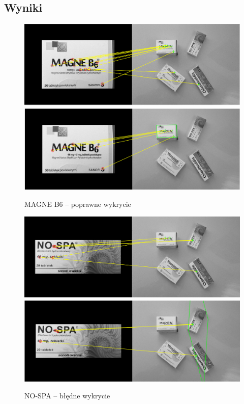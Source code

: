 \documentclass[a4paper, 12pt, titlepage]{article}
\begin{document}
    \subsection{Wyniki}
        \begin{figure}[H]
            \centering
            \includegraphics[width=0.8\linewidth]{third/first_1.png}
            \includegraphics[width=0.8\linewidth]{third/second_1.png}
            \caption{MAGNE B6 -- poprawne wykrycie}
        \end{figure}
        \begin{figure}[H]
            \centering
            \includegraphics[width=0.8\linewidth]{third/first_2.png}
            \includegraphics[width=0.8\linewidth]{third/second_2.png}
            \caption{NO-SPA -- błędne wykrycie}
        \end{figure}
\end{document}
